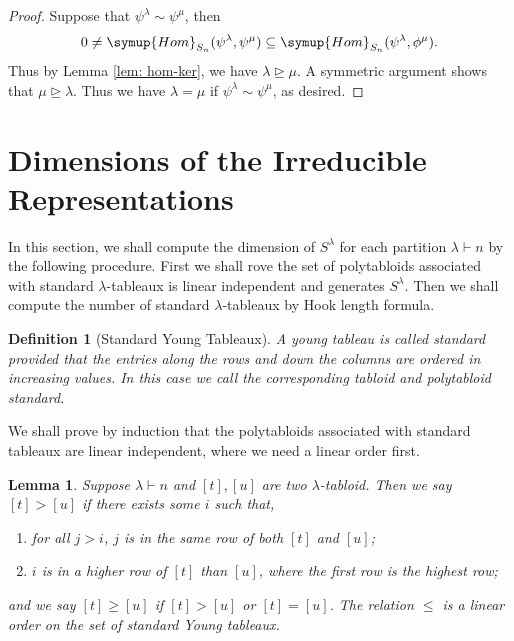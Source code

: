 \documentclass{assignment}[2019/10/15]
\theoremstyle{plain}
\newtheorem{definition}[theorem]{Definition}
\newtheorem{lemma}[theorem]{Lemma}
\newcommand{\Hom}{\mathop{}\!\symup{Hom}}
\numberwithin{equation}{section}
\begin{document}
    \begin{proof}
        Suppose that $\psi^\lambda\sim\psi^\mu$, then
        \begin{equation}
            0\neq \Hom_{S_n}(\psi^\lambda, \psi^\mu)\subseteq \Hom_{S_n}(\psi^\lambda, \phi^\mu).
        \end{equation}
        Thus by Lemma \ref{lem: hom-ker}, we have $\lambda\unrhd\mu$. A symmetric argument shows that $\mu\unrhd\lambda$. Thus we have $\lambda=\mu$ if $\psi^\lambda\sim\psi^\mu$, as desired.
    \end{proof}

    \section{Dimensions of the Irreducible Representations}

    In this section, we shall compute the dimension of $S^\lambda$ for each partition $\lambda\vdash n$ by the following procedure. First we shall rove the set of polytabloids associated with standard $\lambda$-tableaux is linear independent and generates $S^\lambda$. Then we shall compute the number of standard $\lambda$-tableaux by Hook length formula.

    \begin{definition}[Standard Young Tableaux]
        A young tableau is called \emph{standard} provided that the entries along the rows and down the columns are ordered in increasing values. In this case we call the corresponding tabloid and polytabloid standard.
    \end{definition}

    We shall prove by induction that the polytabloids associated with standard tableaux are linear independent, where we need a linear order first.

    \begin{lemma}
        Suppose $\lambda\vdash n$ and $[t], [u]$ are two $\lambda$-tabloid. Then we say $[t]>[u]$ if there exists some $i$ such that,
        \begin{enumerate}[(1)]
            \item for all $j>i$, $j$ is in the same row of both $[t]$ and $[u]$;
            \item $i$ is in a higher row of $[t]$ than $[u]$, where the first row is the highest row;
        \end{enumerate}
        and we say $[t]\geq [u]$ if $[t]>[u]$ or $[t]=[u]$. The relation $\leq$ is a linear order on the set of standard Young tableaux.
    \end{lemma}
\end{document}
